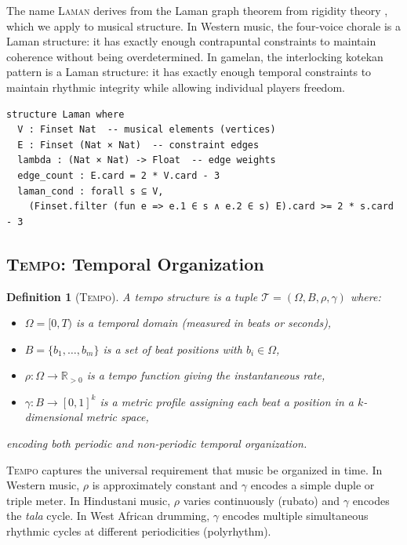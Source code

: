 \documentclass[cmj]{article}
\newtheorem{definition}{Definition}
\newcommand{\R}{\mathbb{R}}
\newcommand{\LAMAN}{\textsc{Laman}}
\newcommand{\TEMPO}{\textsc{Tempo}}
\begin{document}
The name \LAMAN{} derives from the Laman graph theorem from rigidity theory
\citep{laman1970graphs}, which we apply to musical structure. In Western
music, the four-voice chorale is a Laman structure: it has exactly enough
contrapuntal constraints to maintain coherence without being overdetermined. In
gamelan, the interlocking kotekan pattern is a Laman structure: it has exactly
enough temporal constraints to maintain rhythmic integrity while allowing
individual players freedom.

\begin{lstlisting}[style=lean,caption={Lean 4 formalization of LAMAN}]
structure Laman where
  V : Finset Nat  -- musical elements (vertices)
  E : Finset (Nat × Nat)  -- constraint edges
  lambda : (Nat × Nat) -> Float  -- edge weights
  edge_count : E.card = 2 * V.card - 3
  laman_cond : forall s ⊆ V,
    (Finset.filter (fun e => e.1 ∈ s ∧ e.2 ∈ s) E).card >= 2 * s.card - 3
\end{lstlisting}

\subsection{\TEMPO{}: Temporal Organization}
\label{sec:primitive-tempo}

\begin{definition}[\TEMPO{}]
A \emph{tempo structure} is a tuple $\mathcal{T} = (\Omega, B, \rho, \gamma)$
where:
\begin{itemize}[nosep]
  \item $\Omega = [0, T)$ is a temporal domain (measured in beats or seconds),
  \item $B = \{b_1, \ldots, b_m\}$ is a set of \emph{beat positions} with
    $b_i \in \Omega$,
  \item $\rho: \Omega \to \R_{> 0}$ is a \emph{tempo function} giving the
    instantaneous rate,
  \item $\gamma: B \to [0, 1]^k$ is a \emph{metric profile} assigning each
    beat a position in a $k$-dimensional metric space,
\end{itemize}
encoding both periodic and non-periodic temporal organization.
\end{definition}

\TEMPO{} captures the universal requirement that music be organized in time.
In Western music, $\rho$ is approximately constant and $\gamma$ encodes a
simple duple or triple meter. In Hindustani music, $\rho$ varies continuously
(rubato) and $\gamma$ encodes the \emph{tala} cycle. In West African drumming,
$\gamma$ encodes multiple simultaneous rhythmic cycles at different
periodicities (polyrhythm).
\end{document}
